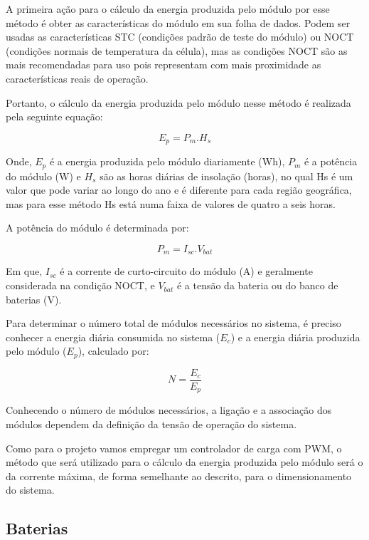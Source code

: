 	A primeira ação para o cálculo da energia produzida pelo módulo por esse método é obter as características do módulo em sua folha de dados. Podem ser usadas as características STC (condições padrão de teste do módulo) ou NOCT (condições normais de temperatura da célula), mas as condições NOCT são as mais recomendadas para uso pois representam com mais proximidade as características reais de operação.
	
	Portanto, o cálculo da energia produzida pelo módulo nesse método é realizada pela seguinte equação:
	
	\begin{equation}
	E_p = P_m . H_s
	\end{equation}
	
	Onde, $E_p$ é a energia produzida pelo módulo diariamente (Wh), $P_m$ é a potência do módulo (W) e $H_s$ são as horas diárias de insolação (horas), no qual Hs é um valor que pode variar ao longo do ano e é diferente para cada região geográfica, mas para esse método Hs está numa faixa de valores de quatro a seis horas.
	
	A potência do módulo é determinada por:
	
	\begin{equation}
	P_m = I_{sc} . V_{bat}
	\end{equation}
	
	Em que, $I_{sc}$ é a corrente de curto-circuito do módulo (A) e geralmente considerada na condição NOCT, e $V_{bat}$ é a tensão da bateria ou do banco de baterias (V).
	
	Para determinar o número total de módulos necessários no sistema, é preciso conhecer a energia diária consumida no sistema ($E_c$) e a energia diária produzida pelo módulo ($E_p$), calculado por:
	
	\begin{equation}
	N = \dfrac{E_c}{E_p}
	\end{equation}
		
	Conhecendo o número de módulos necessários, a ligação e a associação dos módulos dependem da definição da tensão de operação do sistema.
	
	Como para o projeto vamos empregar um controlador de carga com PWM, o método que será utilizado para o cálculo da energia produzida pelo módulo será o da corrente máxima, de forma semelhante ao descrito, para o dimensionamento do sistema.
	 
\subsection{Baterias} 

